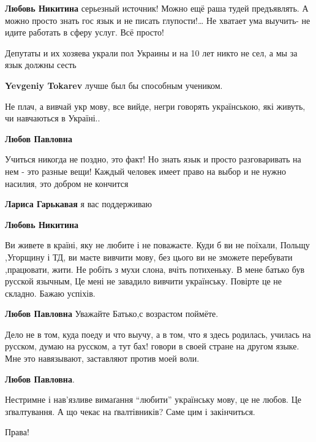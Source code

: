 \begin{itemize}
\begin{itemize}
\textbf{Любовь Никитина} серьезный источник!
Можно ещё раша тудей предъявлять.
А можно просто знать гос язык и не писать глупости!… 
Не хватает ума выучить- не идите работать в сферу услуг.
Всё просто!

Депутаты и их хозяева украли пол Украины и на 10 лет никто не сел, а мы за язык должны сесть

\textbf{Yevgeniy Tokarev} лучше был бы способным учеником.
\end{itemize}


Не плач, а вивчай укр мову, все вийде, негри говорять українською, які живуть,
чи навчаються в Україні..

\begin{itemize}

\textbf{Любов Павловна}

Учиться никогда не поздно, это факт! Но знать язык и просто разговаривать на нем - это разные вещи! Каждый человек имеет право на выбор и не нужно насилия, это добром не кончится

\textbf{Лариса Гарькавая} я вас поддерживаю

\textbf{Любовь Никитина}

Ви живете в країні, яку не любите і не поважаєте. Куди б ви не поїхали, Польщу
,Угорщину і ТД, ви маєте вивчити мову, без цього ви не зможете перебувати
,працювати, жити. Не робіть з мухи слона, вчіть потихеньку.  В мене батько був
русской язычным, Це мені не завадило вивчити українську. Повірте це не складно.
Бажаю успіхів.

\textbf{Любов Павловна} Уважайте Батько,с возрастом поймёте.

Дело не в том, куда поеду и что выучу, а в том, что я здесь родилась, училась
на русском, думаю на русском, а тут бах! говори в своей стране на другом языке.
Мне это навязывают, заставляют против моей воли.

\textbf{Любов Павловна}.

Нестримне і нав'язливе вимаґання \enquote{любити} українську мову, це не любов.
Це зґвалтування.  А що чекає на ґвалтівників? Саме цим і закінчиться.

\end{itemize}

Права!


\end{itemize}
